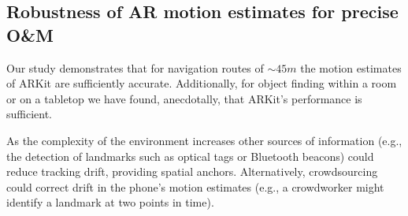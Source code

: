 \documentclass[chi_draft]{sigchi}
\newcommand{\OM}{O\&M\xspace}
\begin{document}
\subsection{Robustness of AR motion estimates for precise \OM} Our study demonstrates that for navigation routes of $\sim45m$ the motion estimates of ARKit are sufficiently accurate.  Additionally, for object finding within a room or on a tabletop we have found, anecdotally, that ARKit's performance is sufficient.

As the complexity of the environment increases other sources of information (e.g., the detection of landmarks such as optical tags or Bluetooth beacons) could reduce tracking drift, providing spatial anchors.  Alternatively, crowdsourcing could correct drift in the phone's motion estimates (e.g., a crowdworker might identify a landmark at two points in time).
\end{document}
